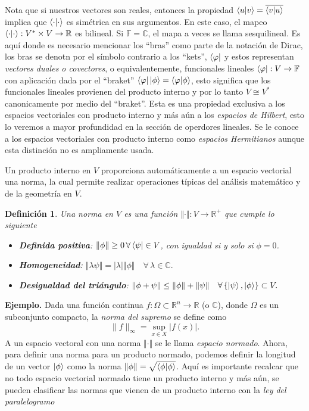 \documentclass[letterpaper]{book}
\newtheorem{def.}{Definici\'on}[section]
\newcommand{\eje}{{\noindent \sc \textbf{Ejemplo. }}}
\newcommand{\om}{\ensuremath{\Omega}}
\newcommand{\co}{\ensuremath{\mathbb C }}
\newcommand{\re}{\ensuremath{\mathbb R }}
\begin{document}
Nota que si nuestros vectores son reales, entonces la propiedad \(\braket{u|v} = \overline{\braket{v|u}}\) implica que \(\braket{\cdot|\cdot}\) es simétrica en sus argumentos. En este caso, el mapeo \(\braket{\cdot|\cdot}: V^{*} \times V \to \re\) es bilineal. Si \(\mathbb{F} = \co\), el mapa a veces se llama sesquilineal. Es aquí donde es necesario mencionar los ``bras'' como parte de la notación de Dirac, los bras se denotn por el símbolo contrario a los ``kets'', $\bra{\varphi}$ y estos representan \emph{vectores duales o covectores}, o equivalentemente, funcionales lineales \hbox{$\bra{\varphi}:V\rightarrow\mathbb{F}$} con aplicación dada por el ``braket'' $\bra{\varphi}\ket{\phi}=\braket{\varphi|\phi}$, esto significa que los funcionales lineales provienen del producto interno y por lo tanto $V\cong V^{*}$ canonicamente por medio del ``braket''. Esta es una propiedad exclusiva a los espacios vectoriales con producto interno y más aún a los \emph{espacios de Hilbert}, esto lo veremos a mayor profundidad en la sección de operdores lineales. Se le conoce a los espacios vectoriales con producto interno como \emph{espacios Hermitianos} aunque esta distinción no es ampliamente usada.

Un producto interno en \(V\) proporciona automáticamente a un espacio vectorial una norma, la cual permite realizar operaciones típicas del análisis matemático y de la geometría en \(V\).
\begin{def.}
Una norma en \(V\) es una función \(\Vert\cdot\Vert:V\rightarrow\re^{+}\) que cumple lo siguiente
\begin{itemize}
    \item \textbf{Definida positiva}: \(\Vert\phi\Vert \geq 0\,\forall \bra{\psi} \in V\), con igualdad si y solo si \(\phi = 0\).
    \item \textbf{Homogeneidad}: \(\Vert \lambda \psi\Vert = |\lambda|\Vert\phi\Vert\quad\forall\,\lambda\in\co.\)
    \item \textbf{Desigualdad del triángulo}: \(\Vert \phi + \psi\Vert \leq \Vert\phi\Vert + \Vert\psi\Vert\quad\forall\,\{\ket{\psi},\ket{\phi}\}\subset V.\)
\end{itemize}
\end{def.}
\eje Dada una función continua \(f: \om\subset\re^n \to \mathbb{R}\) (o \(\mathbb{C}\)), donde \(\om\) es un subconjunto compacto, la \emph{norma del supremo} se define como
    \[
    \|f\|_\infty = \sup_{x \in X} |f(x)|.
    \]
A un espacio vectoral con una norma \(\Vert\cdot\Vert\) se le llama \emph{espacio normado}. Ahora, para definir una norma para un producto normado, podemos definir la longitud de un vector \(\ket{\phi}\) como la norma \(\Vert\phi\Vert=\sqrt{\braket{\phi|\phi}}\). Aquí es importante recalcar que no todo espacio vectorial normado tiene un producto interno y más aún, se pueden clasificar las normas que vienen de un producto interno con la \emph{ley del paralelogramo}
\end{document}

